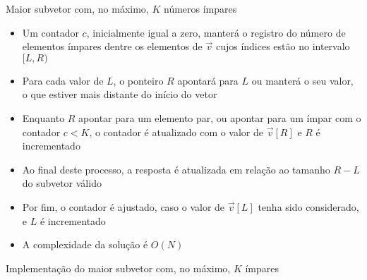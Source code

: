 \begin{frame}[fragile]{Maior subvetor com, no máximo, $K$ números ímpares}

    \begin{itemize}
        \item Um contador $c$, inicialmente igual a zero, manterá o registro do número de elementos
            ímpares dentre os elementos de $\vec{v}$ cujos índices estão no intervalo $[L, R)$

        \item Para cada valor de $L$, o ponteiro $R$ apontará para $L$ ou manterá o seu valor, o 
            que estiver mais distante do início do vetor

        \item Enquanto $R$ apontar para um elemento par, ou apontar para um ímpar com o contador
            $c < K$, o contador é atualizado com o valor de $\vec{v}[R]$ e $R$ é incrementado

        \item Ao final deste processo, a resposta é atualizada em relação ao tamanho $R - L$ do subvetor
            válido

        \item Por fim, o contador é ajustado, caso o valor de $\vec{v}[L]$ tenha sido
            considerado, e $L$ é incrementado

        \item A complexidade da solução é $O(N)$
    \end{itemize}

\end{frame}



\begin{frame}[fragile]{Implementação do maior subvetor com, no máximo, $K$ ímpares}
\end{frame}


